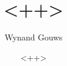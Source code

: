 \documentclass[a4paper, 11pt]{article}
\author{Wynand Gouws}
\title{<++>}
\date{<++>}
\begin{document}
\maketitle
\tableofcontents
\listoftables
\listoffigures



\printbibliography{}
\end{document}
